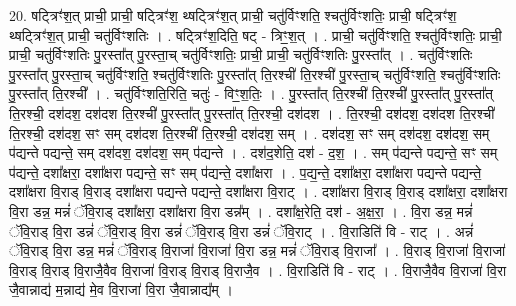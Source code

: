 \documentclass[17pt]{extarticle}
\begin{document}
20. षट्त्रिꣳ॑श॒त् प्राची॒ प्राची॒ षट्त्रिꣳ॑श॒ थ्षट्त्रिꣳ॑श॒त् प्राची॒ चतु॑र्विꣳशति॒ श्चतु॑र्विꣳशतिः॒ प्राची॒ षट्त्रिꣳ॑श॒ थ्षट्त्रिꣳ॑श॒त् प्राची॒ चतु॑र्विꣳशतिः । . षट्त्रिꣳ॑श॒दिति॒ षट् - त्रिꣳ॒॒श॒त् । . प्राची॒ चतु॑र्विꣳशति॒ श्चतु॑र्विꣳशतिः॒ प्राची॒ प्राची॒ चतु॑र्विꣳशतिः पु॒रस्ता᳚त् पु॒रस्ता॒च् चतु॑र्विꣳशतिः॒ प्राची॒ प्राची॒ चतु॑र्विꣳशतिः पु॒रस्ता᳚त् । . चतु॑र्विꣳशतिः पु॒रस्ता᳚त् पु॒रस्ता॒च् चतु॑र्विꣳशति॒ श्चतु॑र्विꣳशतिः पु॒रस्ता᳚त् ति॒रश्ची॑ ति॒रश्ची॑ पु॒रस्ता॒च् चतु॑र्विꣳशति॒ श्चतु॑र्विꣳशतिः पु॒रस्ता᳚त् ति॒रश्ची᳚ । . चतु॑र्विꣳशति॒रिति॒ चतुः॑ - विꣳ॒॒श॒तिः॒ । . पु॒रस्ता᳚त् ति॒रश्ची॑ ति॒रश्ची॑ पु॒रस्ता᳚त् पु॒रस्ता᳚त् ति॒रश्ची॒ दश॑दश॒ दश॑दश ति॒रश्ची॑ पु॒रस्ता᳚त् पु॒रस्ता᳚त् ति॒रश्ची॒ दश॑दश । . ति॒रश्ची॒ दश॑दश॒ दश॑दश ति॒रश्ची॑ ति॒रश्ची॒ दश॑दश॒ सꣳ सम् दश॑दश ति॒रश्ची॑ ति॒रश्ची॒ दश॑दश॒ सम् । . दश॑दश॒ सꣳ सम् दश॑दश॒ दश॑दश॒ सम् प॑द्यन्ते पद्यन्ते॒ सम् दश॑दश॒ दश॑दश॒ सम् प॑द्यन्ते । . दश॑द॒शेति॒ दश॑ - द॒श॒ । . सम् प॑द्यन्ते पद्यन्ते॒ सꣳ सम् प॑द्यन्ते॒ दशा᳚क्षरा॒ दशा᳚क्षरा पद्यन्ते॒ सꣳ सम् प॑द्यन्ते॒ दशा᳚क्षरा । . प॒द्य॒न्ते॒ दशा᳚क्षरा॒ दशा᳚क्षरा पद्यन्ते पद्यन्ते॒ दशा᳚क्षरा वि॒राड् वि॒राड् दशा᳚क्षरा पद्यन्ते पद्यन्ते॒ दशा᳚क्षरा वि॒राट् । . दशा᳚क्षरा वि॒राड् वि॒राड् दशा᳚क्षरा॒ दशा᳚क्षरा वि॒रा डन्न॒ मन्नं॑ ॅवि॒राड् दशा᳚क्षरा॒ दशा᳚क्षरा वि॒रा डन्न᳚म् । . दशा᳚क्ष॒रेति॒ दश॑ - अ॒क्ष॒रा॒ । . वि॒रा डन्न॒ मन्नं॑ ॅवि॒राड् वि॒रा डन्नं॑ ॅवि॒राड् वि॒रा डन्नं॑ ॅवि॒राड् वि॒रा डन्नं॑ ॅवि॒राट् । . वि॒राडिति॑ वि - राट् । . अन्नं॑ ॅवि॒राड् वि॒रा डन्न॒ मन्नं॑ ॅवि॒राड् वि॒राजा॑ वि॒राजा॑ वि॒रा डन्न॒ मन्नं॑ ॅवि॒राड् वि॒राजा᳚ । . वि॒राड् वि॒राजा॑ वि॒राजा॑ वि॒राड् वि॒राड् वि॒राजै॒वैव वि॒राजा॑ वि॒राड् वि॒राड् वि॒राजै॒व । . वि॒राडिति॑ वि - राट् । . वि॒राजै॒वैव वि॒राजा॑ वि॒रा जै॒वान्नाद्य॑ म॒न्नाद्य॑ मे॒व वि॒राजा॑ वि॒रा जै॒वान्नाद्य᳚म् । \newline
\end{document}

